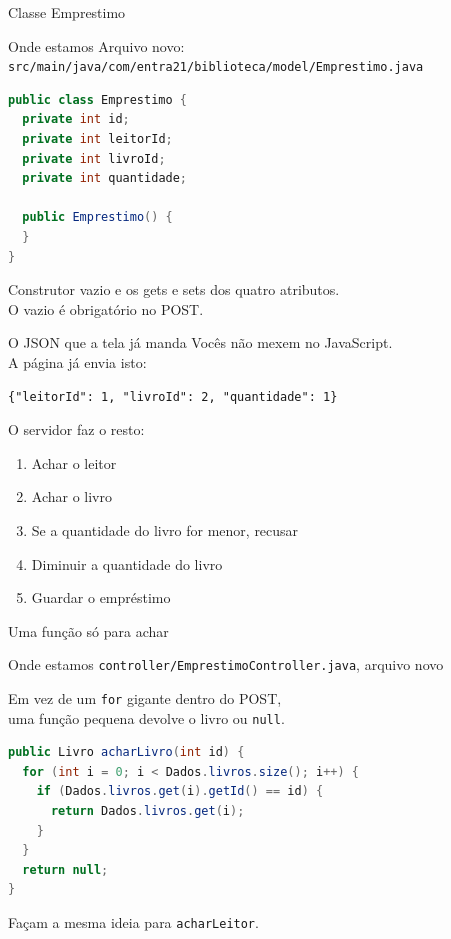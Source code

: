 \documentclass[aspectratio=169,11pt]{beamer}
\newcommand{\onde}[1]{%
  \begin{block}{Onde estamos}
    #1
  \end{block}
}
\begin{document}
\begin{frame}[fragile]{Classe Emprestimo}
  \onde{Arquivo novo:\\
        \texttt{src/main/java/com/entra21/biblioteca/model/Emprestimo.java}}

\begin{lstlisting}[language=Java,basicstyle=\ttfamily\footnotesize]
public class Emprestimo {
  private int id;
  private int leitorId;
  private int livroId;
  private int quantidade;

  public Emprestimo() {
  }
}
\end{lstlisting}

  Construtor vazio e os gets e sets dos quatro atributos.\\
  O vazio é obrigatório no POST.
\end{frame}

\begin{frame}[fragile]{O JSON que a tela já manda}
  Vocês não mexem no JavaScript.\\
  A página já envia isto:

  \vspace{0.4em}
\begin{lstlisting}[basicstyle=\ttfamily\footnotesize]
{"leitorId": 1, "livroId": 2, "quantidade": 1}
\end{lstlisting}

  \vspace{0.5em}
  O servidor faz o resto:
  \begin{enumerate}
    \item Achar o leitor
    \item Achar o livro
    \item Se a quantidade do livro for menor, recusar
    \item Diminuir a quantidade do livro
    \item Guardar o empréstimo
  \end{enumerate}
\end{frame}

\begin{frame}[fragile]{Uma função só para achar}
  \onde{\texttt{controller/EmprestimoController.java}, arquivo novo}

  Em vez de um \texttt{for} gigante dentro do POST,\\
  uma função pequena devolve o livro ou \texttt{null}.

\begin{lstlisting}[language=Java,basicstyle=\ttfamily\scriptsize]
public Livro acharLivro(int id) {
  for (int i = 0; i < Dados.livros.size(); i++) {
    if (Dados.livros.get(i).getId() == id) {
      return Dados.livros.get(i);
    }
  }
  return null;
}
\end{lstlisting}

  Façam a mesma ideia para \texttt{acharLeitor}.
\end{frame}
\end{document}
